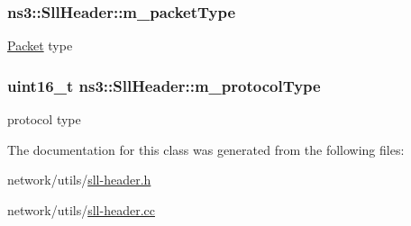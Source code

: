 \subsubsection[{\texorpdfstring{m\+\_\+packet\+Type}{m_packetType}}]{ ns3\+::\+Sll\+Header\+::m\+\_\+packet\+Type\hspace{0.3cm}{\ttfamily [protected]}}\hypertarget{classns3_1_1SllHeader_a52acf6bb601a147c066bd73cec97ba64}{}\label{classns3_1_1SllHeader_a52acf6bb601a147c066bd73cec97ba64}
\hyperlink{classns3_1_1Packet}{Packet} type 
\subsubsection[{\texorpdfstring{m\+\_\+protocol\+Type}{m_protocolType}}]{\setlength{\rightskip}{0pt plus 5cm}uint16\+\_\+t ns3\+::\+Sll\+Header\+::m\+\_\+protocol\+Type\hspace{0.3cm}{\ttfamily [protected]}}\hypertarget{classns3_1_1SllHeader_ad841f705bde071f5eacbd30672e8d701}{}\label{classns3_1_1SllHeader_ad841f705bde071f5eacbd30672e8d701}
protocol type 

The documentation for this class was generated from the following files\+:\begin{DoxyCompactItemize}
\item 
network/utils/\hyperlink{sll-header_8h}{sll-\/header.\+h}\item 
network/utils/\hyperlink{sll-header_8cc}{sll-\/header.\+cc}\end{DoxyCompactItemize}
